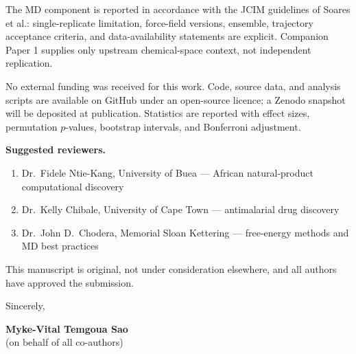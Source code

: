 \documentclass[11pt,letterpaper]{article}
\begin{document}
The MD component is reported in accordance with the JCIM guidelines of Soares et al.: single-replicate limitation, force-field versions, ensemble, trajectory acceptance criteria, and data-availability statements are explicit. Companion Paper 1 supplies only upstream chemical-space context, not independent replication.

No external funding was received for this work. Code, source data, and analysis scripts are available on GitHub under an open-source licence; a Zenodo snapshot will be deposited at publication. Statistics are reported with effect sizes, permutation $p$-values, bootstrap intervals, and Bonferroni adjustment.

\noindent\textbf{Suggested reviewers.}
\begin{enumerate}
  \item Dr.\ Fidele Ntie-Kang, University of Buea --- African natural-product computational discovery
  \item Dr.\ Kelly Chibale, University of Cape Town --- antimalarial drug discovery
  \item Dr.\ John D.\ Chodera, Memorial Sloan Kettering --- free-energy methods and MD best practices
\end{enumerate}

\noindent This manuscript is original, not under consideration elsewhere, and all authors have approved the submission.

\vspace{1em}

\noindent Sincerely,

\vspace{1em}

\noindent \textbf{Myke-Vital Temgoua Sao} \\
(on behalf of all co-authors)
\end{document}
